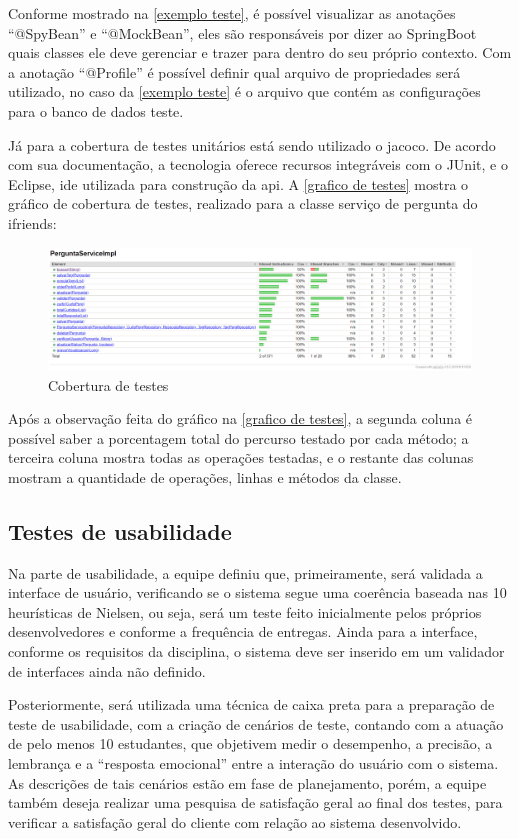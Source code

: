 Conforme mostrado na \autoref{exemplo teste}, é possível visualizar as anotações ``@SpyBean'' e ``@MockBean'', eles são responsáveis por dizer ao \gls{SpringBoot} quais classes ele deve gerenciar e trazer para dentro do seu próprio contexto. Com a anotação ``@Profile'' é possível definir qual arquivo de propriedades será utilizado, no caso da \autoref{exemplo teste} é o arquivo que contém as configurações para o banco de dados teste.

Já para a cobertura de testes unitários está sendo utilizado o \acs{jacoco}. De acordo com sua documentação, a tecnologia oferece recursos integráveis com o \gls{JUnit}, e o \gls{Eclipse}, \acs{ide} utilizada para construção da \acs{api}. A \autoref{grafico de testes} mostra o gráfico de cobertura de testes, realizado para a classe serviço de pergunta do \gls{ifriends}:

\begin{figure}[htb]
\centering
\caption{\label{grafico de testes} Cobertura de testes}
\includegraphics[width=1\textwidth]{anexos/Imagens_Testes/API_grafico-testes.png}
\end{figure}
\FloatBarrier

Após a observação feita do gráfico na \autoref{grafico de testes}, a segunda coluna é possível saber a porcentagem total do percurso testado por cada método; a terceira coluna mostra todas as operações testadas, e o restante das colunas mostram a quantidade de operações, linhas e métodos da classe.

\subsection{Testes de usabilidade}
Na parte de usabilidade, a equipe definiu que, primeiramente, será validada a interface de usuário, verificando se o sistema segue uma coerência baseada nas 10 heurísticas de Nielsen, ou seja, será um teste feito inicialmente pelos próprios desenvolvedores e conforme a frequência de entregas. Ainda para a interface, conforme os requisitos da disciplina,  o sistema deve ser inserido em um validador de interfaces ainda não definido. 

Posteriormente, será utilizada uma técnica de caixa preta para a preparação de teste de usabilidade, com a criação de cenários de teste, contando com a atuação de pelo menos 10 estudantes, que objetivem medir o desempenho, a precisão, a lembrança e a “resposta emocional” entre a interação do usuário com o sistema. As descrições de tais cenários estão em fase de planejamento, porém, a equipe também deseja realizar uma pesquisa de satisfação geral ao final dos testes, para verificar a satisfação geral do cliente com relação ao sistema desenvolvido.
